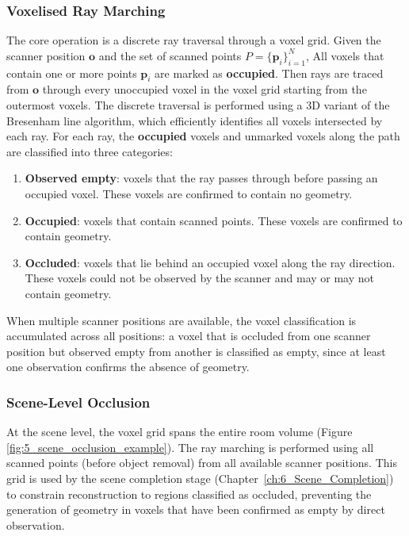 \subsubsection{Voxelised Ray Marching}
\label{sec:5_raymarching}


The core operation is a discrete ray traversal through a voxel grid. Given the scanner position $\mathbf{o}$ and the set of scanned points $P = \{\mathbf{p}_i\}_{i=1}^{N}$, All voxels that contain one or more points $\mathbf{p}_i$ are marked as \textbf{occupied}. Then rays are traced from $\mathbf{o}$ through every unoccupied voxel in the voxel grid starting from the outermost voxels. The discrete traversal is performed using a 3D variant of the Bresenham line algorithm, which efficiently identifies all voxels intersected by each ray. For each ray, the \textbf{occupied} voxels and unmarked voxels along the path are classified into three categories:

\begin{enumerate}
    \item \textbf{Observed empty}: voxels that the ray passes through before passing an occupied voxel. These voxels are confirmed to contain no geometry.
    \item \textbf{Occupied}: voxels that contain scanned points. These voxels are confirmed to contain geometry.
    \item \textbf{Occluded}: voxels that lie behind an occupied voxel along the ray direction. These voxels could not be observed by the scanner and may or may not contain geometry.
\end{enumerate}

When multiple scanner positions are available, the voxel classification is accumulated across all positions: a voxel that is occluded from one scanner position but observed empty from another is classified as empty, since at least one observation confirms the absence of geometry.


\subsubsection{Scene-Level Occlusion}
\label{sec:5_scene_occlusion}

At the scene level, the voxel grid spans the entire room volume (Figure \ref{fig:5_scene_occlusion_example}). The ray marching is performed using all scanned points (before object removal) from all available scanner positions. This grid is used by the scene completion stage (Chapter~\ref{ch:6_Scene_Completion}) to constrain reconstruction to regions classified as occluded, preventing the generation of geometry in voxels that have been confirmed as empty by direct observation.

